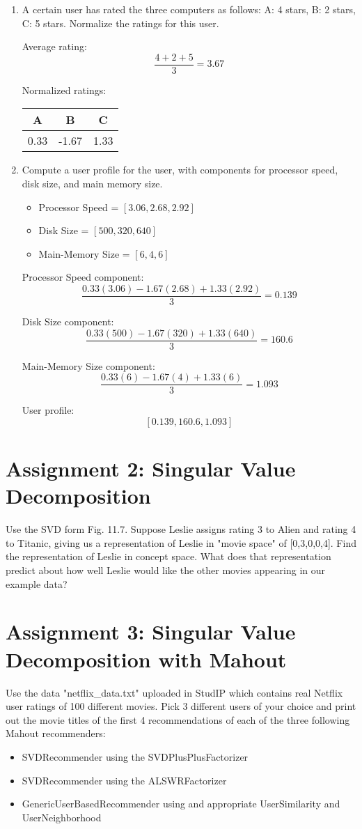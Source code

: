 \documentclass{article}
\begin{document}
\begin{enumerate}
\item{A certain user has rated the three computers as follows: A: 4 stars, B: 2 stars, C: 5 stars. Normalize the ratings for this user.

Average rating: $$\frac{4+2+5}{3} = 3.67$$

Normalized ratings:
	\begin{center}
	\begin{tabular}{ c | c | c }
		A    & B     & C    \\ \hline
		0.33 & -1.67 & 1.33
	\end{tabular}
\end{center}
}
\item{Compute a user profile for the user, with components for processor speed, disk size, and main memory size.
	
	\begin{itemize}
		\item Processor Speed = $[3.06, 2.68, 2.92]$
		\item Disk Size = $[500, 320, 640]$
		\item Main-Memory Size = $[6, 4, 6]$
	\end{itemize}

	Processor Speed component:
	$$\frac{0.33(3.06)-1.67(2.68)+1.33(2.92)}{3} = 0.139$$

	Disk Size component:
	$$\frac{0.33(500)-1.67(320)+1.33(640)}{3} = 160.6$$
	
	Main-Memory Size component:
	$$\frac{0.33(6)-1.67(4)+1.33(6)}{3} = 1.093$$

	User profile:
	$$[0.139, 160.6, 1.093]$$

}
\end{enumerate}

\section{Assignment 2: Singular Value Decomposition}
Use the SVD form Fig. 11.7. Suppose Leslie assigns rating 3 to Alien and rating 4 to Titanic, giving us a representation of Leslie in "movie space" of [0,3,0,0,4]. Find the representation of Leslie in concept space. What does that representation predict about how well Leslie would like the other movies appearing in our example data?

\section{Assignment 3: Singular Value Decomposition with Mahout}
Use the data "netflix\_data.txt" uploaded in StudIP which contains real Netflix user ratings of 100 different movies. Pick 3 different users of your choice and print out the movie titles of the first 4 recommendations of each of the three following Mahout recommenders:
\begin{itemize}
	\item SVDRecommender using the SVDPlusPlusFactorizer
	\item SVDRecommender using the ALSWRFactorizer
	\item GenericUserBasedRecommender using and appropriate UserSimilarity and UserNeighborhood
\end{itemize}
\end{document}
